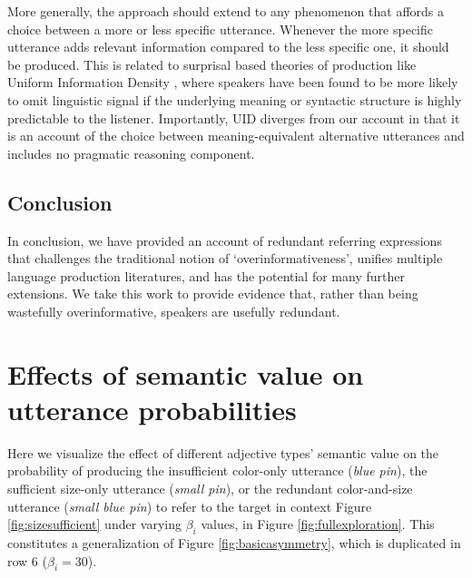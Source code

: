 \documentclass[11pt]{article}
\newcommand{\jd}[1]{\textcolor{Red}{[jd: #1]}}
\newcommand{\figref}[1]{Figure \ref{#1}}
\begin{document}
More generally, the approach should extend to any  phenomenon that affords a choice between a more or less specific utterance. Whenever the more specific utterance adds relevant information compared to the less specific one, it should be produced. This is related to surprisal based theories of production like Uniform Information Density \cite<UID,>{jaeger2006, levy2007, frank2008, jaeger2010}, where  speakers have been found to be more likely to omit linguistic signal if the underlying meaning or syntactic structure is highly predictable to the listener. Importantly, UID diverges from our account in that it is an account of the choice between meaning-equivalent alternative utterances and includes no pragmatic reasoning component. 



\subsection{Conclusion}
\label{sec:conclusion}

In conclusion, we have provided an account of redundant referring expressions that challenges the traditional notion of `overinformativeness', unifies multiple language production literatures, and has the potential for many further extensions. We take this work to provide evidence that, rather than being wastefully overinformative, speakers are usefully redundant.


\appendix

\section{Effects of semantic value on utterance probabilities}
\label{app:modelexploration}

Here we visualize the effect of different adjective types' semantic value on the probability of producing the insufficient color-only utterance (\emph{blue pin}), the sufficient size-only utterance (\emph{small pin}), or the redundant color-and-size utterance  (\emph{small blue pin}) to refer to the target in context \figref{fig:sizesufficient} under varying $\beta_i$ values, in \figref{fig:fullexploration}. This constitutes a generalization of \figref{fig:basicasymmetry}, which is duplicated in row 6 ($\beta_i = 30$).
\end{document}
